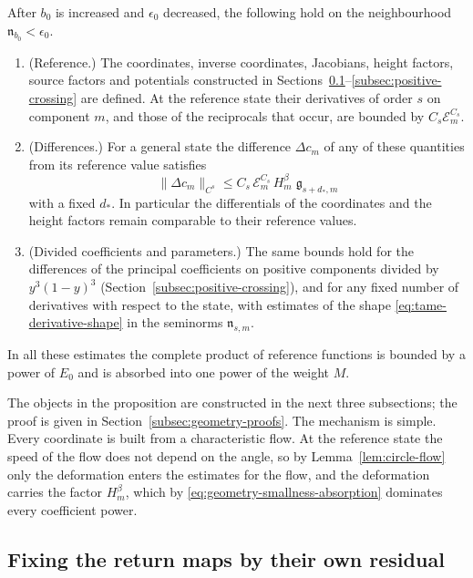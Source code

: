 \begin{proposition}
\label{prop:uniform-physical-geometry}
After $b_0$ is increased and $\epsilon_0$ decreased, the following
hold on the neighbourhood $\mathfrak n_{b_0}<\epsilon_0$.
\begin{enumerate}
\item \textup{(Reference.)} The coordinates, inverse coordinates,
 Jacobians, height factors, source factors and potentials constructed
 in
 Sections~\ref{subsec:return-correction}--\ref{subsec:positive-crossing}
 are defined. At the reference state their derivatives of order $s$
 on component $m$, and those of the reciprocals that occur, are
 bounded by $C_s\mathcal E_m^{C_s}$.
\item \textup{(Differences.)} For a general state the difference
 $\Delta c_m$ of any of these quantities from its reference value
 satisfies
 \begin{equation}\label{eq:geometry-current-jet-bound}
  \|\Delta c_m\|_{C^s}
  \le C_s\,\mathcal E_m^{C_s}\,H_m^\beta\;\mathfrak g_{s+d_*,m}
 \end{equation}
 with a fixed $d_*$. In particular the differentials of the
 coordinates and the height factors remain comparable to their
 reference values.
\item \textup{(Divided coefficients and parameters.)} The same bounds
 hold for the differences of the principal coefficients on positive
 components divided by $y^3(1-y)^3$
 (Section~\ref{subsec:positive-crossing}), and for any fixed number
 of derivatives with respect to the state, with estimates of the
 shape \eqref{eq:tame-derivative-shape} in the seminorms
 $\mathfrak n_{s,m}$.
\end{enumerate}
In all these estimates the complete product of reference functions is
bounded by a power of $E_0$ and is absorbed into one power of the
weight $M$.
\end{proposition}

The objects in the proposition are constructed in the next three
subsections; the proof is given in
Section~\ref{subsec:geometry-proofs}. The mechanism is simple. Every
coordinate is built from a characteristic flow. At the reference
state the speed of the flow does not depend on the angle, so by
Lemma~\ref{lem:circle-flow} only the deformation enters the
estimates for the flow, and the deformation carries the factor
$H_m^\beta$, which by \eqref{eq:geometry-smallness-absorption}
dominates every coefficient power.

\subsection{Fixing the return maps by their own residual}
\label{subsec:return-correction}

